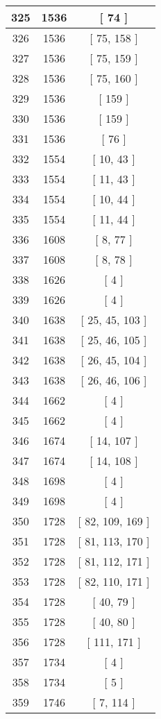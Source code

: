 \begin{center}
\begin{longtable}[H]{|| c c c ||}
325 & 1536 & [ 74 ] \\ 
\hline
326 & 1536 & [ 75, 158 ] \\ 
\hline
327 & 1536 & [ 75, 159 ] \\ 
\hline
328 & 1536 & [ 75, 160 ] \\ 
\hline
329 & 1536 & [ 159 ] \\ 
\hline
330 & 1536 & [ 159 ] \\ 
\hline
331 & 1536 & [ 76 ] \\ 
\hline
332 & 1554 & [ 10, 43 ] \\ 
\hline
333 & 1554 & [ 11, 43 ] \\ 
\hline
334 & 1554 & [ 10, 44 ] \\ 
\hline
335 & 1554 & [ 11, 44 ] \\ 
\hline
336 & 1608 & [ 8, 77 ] \\ 
\hline
337 & 1608 & [ 8, 78 ] \\ 
\hline
338 & 1626 & [ 4 ] \\ 
\hline
339 & 1626 & [ 4 ] \\ 
\hline
340 & 1638 & [ 25, 45, 103 ] \\ 
\hline
341 & 1638 & [ 25, 46, 105 ] \\ 
\hline
342 & 1638 & [ 26, 45, 104 ] \\ 
\hline
343 & 1638 & [ 26, 46, 106 ] \\ 
\hline
344 & 1662 & [ 4 ] \\ 
\hline
345 & 1662 & [ 4 ] \\ 
\hline
346 & 1674 & [ 14, 107 ] \\ 
\hline
347 & 1674 & [ 14, 108 ] \\ 
\hline
348 & 1698 & [ 4 ] \\ 
\hline
349 & 1698 & [ 4 ] \\ 
\hline
350 & 1728 & [ 82, 109, 169 ] \\ 
\hline
351 & 1728 & [ 81, 113, 170 ] \\ 
\hline
352 & 1728 & [ 81, 112, 171 ] \\ 
\hline
353 & 1728 & [ 82, 110, 171 ] \\ 
\hline
354 & 1728 & [ 40, 79 ] \\ 
\hline
355 & 1728 & [ 40, 80 ] \\ 
\hline
356 & 1728 & [ 111, 171 ] \\ 
\hline
357 & 1734 & [ 4 ] \\ 
\hline
358 & 1734 & [ 5 ] \\ 
\hline
359 & 1746 & [ 7, 114 ] \\ 

\end{longtable}
\end{center}
